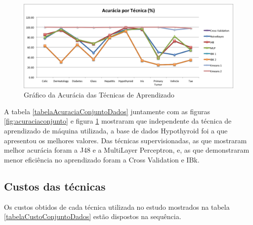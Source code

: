 \documentclass[12pt]{article}
\begin{document}
\begin{figure}[!h]
\centering
\includegraphics[width=.68\textwidth]{AcuraciaTecnica.png}
\caption{Gráfico da Acurácia das Técnicas de Aprendizado}
\label{fig:acuraciatecnica}
\end{figure}

A tabela \ref{tabelaAcuraciaConjuntoDados} juntamente com as figuras  \ref{fig:acuraciaconjunto} e figura \ref{fig:acuraciatecnica} mostraram que independente da técnica de aprendizado de máquina utilizada, a base de dados Hypothyroid foi a que apresentou os melhores valores. Das técnicas supervisionadas, as que mostraram melhor acurácia foram a J48 e a MultiLayer Perceptron, e, as que demonstraram menor eficiência no aprendizado foram a Cross Validation e IBk.

\subsection{Custos das técnicas} \label{sec:custo}

Os custos obtidos de cada técnica utilizada no estudo mostrados na tabela \ref{tabelaCustoConjuntoDados} estão dispostos na sequência.
\end{document}
